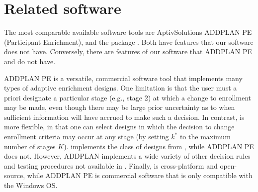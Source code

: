 \documentclass[article]{jss}
\begin{document}



\section{Related software}
\label{ADDPLAN}


The most comparable available software tools are AptivSolutions ADDPLAN PE (Participant Enrichment), and the   package \citep{parsons2012r}. Both have features that our software does not have. Conversely, there are features of our software that ADDPLAN PE and  do not have.

ADDPLAN PE is a versatile, commercial software tool that implements many types of adaptive enrichment designs. One limitation is that the user must a priori designate a particular stage (e.g., stage 2) at which a change to enrollment may be made, even though there may be large prior uncertainty as to when sufficient information will have accrued to make such a decision. In contrast,  is more flexible, in that one can select designs in which the decision to change enrollment criteria may occur at any stage (by setting $k^*$ to the maximum number of stages $K$). 
   implements the class of designs from \citep{Rosenblum2013AdaptMISTIE}, while ADDPLAN PE does not. However, ADDPLAN implements a wide variety of other decision rules and testing procedures not available in  .
Finally,   is cross-platform and open-source, while ADDPLAN PE is commercial software that is only compatible with the Windows OS.
\end{document}
